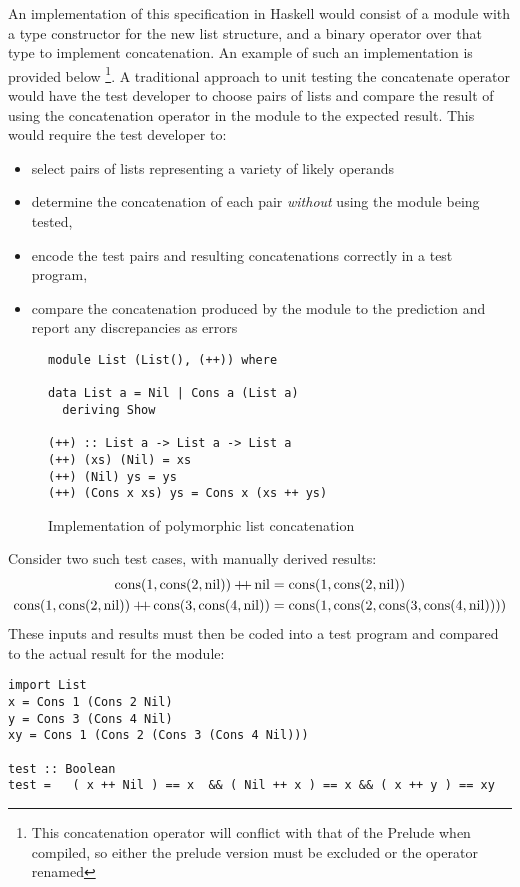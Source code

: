 An implementation of this specification in Haskell
would consist of a module with a type constructor for the new list structure,
and a binary operator over that type to implement concatenation.
An example of such an implementation is provided below%
\footnote{This concatenation operator will conflict with that of the Prelude when compiled,
so either the prelude version must be excluded or the operator renamed}.
A traditional approach to unit testing the concatenate operator would have
the test developer to choose pairs of lists
and compare the result of using the concatenation operator in the module
to the expected result.
This would require the test developer to:
\begin{itemize}
\item select pairs of lists representing a variety of likely operands
\item determine the concatenation of each pair \emph{without} using the module being tested,
\item encode the test pairs and resulting concatenations correctly in a test program,
\item compare the concatenation produced by the module to the prediction
and report any discrepancies as errors
\end{itemize}

\begin{figure*}
\begin{lstlisting}
module List (List(), (++)) where

data List a = Nil | Cons a (List a)
  deriving Show

(++) :: List a -> List a -> List a
(++) (xs) (Nil) = xs
(++) (Nil) ys = ys
(++) (Cons x xs) ys = Cons x (xs ++ ys)
\end{lstlisting}
\caption{Implementation of polymorphic list concatenation}
\label{intro_spec_impl}
\end{figure*}

Consider two such test cases,
with manually derived results:
\begin{align*}
\operatorname{cons}(1, \operatorname{cons} (2, \operatorname{nil})) +\!\!\!+ \operatorname{nil} & = \operatorname{cons}(1, \operatorname{cons} (2, \operatorname{nil}))\\
\operatorname{cons}(1, \operatorname{cons} (2, \operatorname{nil})) +\!\!\!+ \operatorname{cons}(3, \operatorname{cons} (4, \operatorname{nil})) & = \operatorname{cons}(1, \operatorname{cons} (2, \operatorname{cons}(3, \operatorname{cons} (4, \operatorname{nil}))))
\end{align*}
\noindent
These inputs and results must then be coded into a test program
and compared to the actual result for the module:
\begin{lstlisting}
import List
x = Cons 1 (Cons 2 Nil)
y = Cons 3 (Cons 4 Nil)
xy = Cons 1 (Cons 2 (Cons 3 (Cons 4 Nil)))

test :: Boolean
test =   ( x ++ Nil ) == x  && ( Nil ++ x ) == x && ( x ++ y ) == xy
\end{lstlisting}

